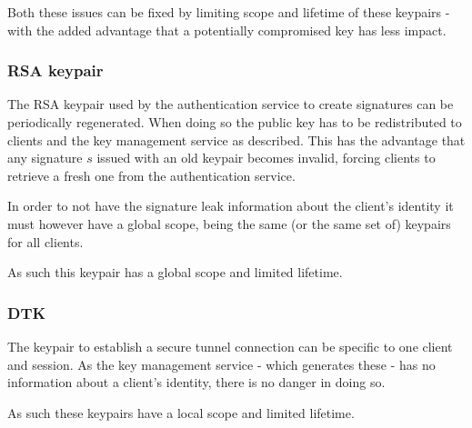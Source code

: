 \documentclass[a4paper]{scrreprt}
\begin{document}
Both these issues can be fixed by limiting scope and lifetime of these keypairs
- with the added advantage that a potentially compromised key has less impact.

\subsubsection{RSA keypair}

The RSA keypair used by the authentication service to create signatures can be
periodically regenerated. When doing so the public key has to be redistributed
to clients and the key management service as described. This has the advantage
that any signature $s$ issued with an old keypair becomes invalid, forcing
clients to retrieve a fresh one from the authentication service.

In order to not have the signature leak information about the client's identity
it must however have a global scope, being the same (or the same set of)
keypairs for all clients.

As such this keypair has a global scope and limited lifetime.

\subsubsection{DTK}

The keypair to establish a secure tunnel connection can be specific to one
client and session. As the key management service - which generates these - has
no information about a client's identity, there is no danger in doing so.

As such these keypairs have a local scope and limited lifetime.
\end{document}
